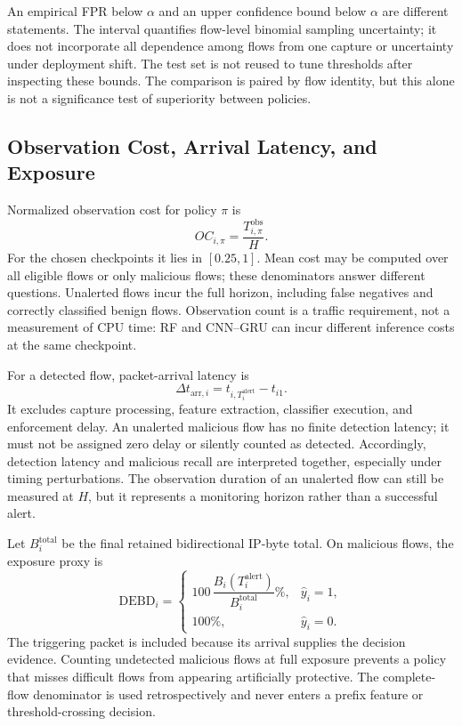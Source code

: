 \documentclass[conference]{IEEEtran}
\begin{document}
An empirical FPR below $\alpha$ and an upper confidence bound below $\alpha$ are different statements. The interval quantifies flow-level binomial sampling uncertainty; it does not incorporate all dependence among flows from one capture or uncertainty under deployment shift. The test set is not reused to tune thresholds after inspecting these bounds. The comparison is paired by flow identity, but this alone is not a significance test of superiority between policies.

\subsection{Observation Cost, Arrival Latency, and Exposure}
Normalized observation cost for policy $\pi$ is
\begin{equation}
OC_{i,\pi}=\frac{T_{i,\pi}^{\mathrm{obs}}}{H}.
\label{eq:observation_cost}
\end{equation}
For the chosen checkpoints it lies in $[0.25,1]$. Mean cost may be computed over all eligible flows or only malicious flows; these denominators answer different questions. Unalerted flows incur the full horizon, including false negatives and correctly classified benign flows. Observation count is a traffic requirement, not a measurement of CPU time: RF and CNN--GRU can incur different inference costs at the same checkpoint.

For a detected flow, packet-arrival latency is
\begin{equation}
\Delta t_{\mathrm{arr},i}
=t_{i,T_i^{\mathrm{alert}}}-t_{i1}.
\label{eq:arrival_latency}
\end{equation}
It excludes capture processing, feature extraction, classifier execution, and enforcement delay. An unalerted malicious flow has no finite detection latency; it must not be assigned zero delay or silently counted as detected. Accordingly, detection latency and malicious recall are interpreted together, especially under timing perturbations. The observation duration of an unalerted flow can still be measured at $H$, but it represents a monitoring horizon rather than a successful alert.

Let $B_i^{\mathrm{total}}$ be the final retained bidirectional IP-byte total. On malicious flows, the exposure proxy is
\begin{equation}
\mathrm{DEBD}_i=
\begin{cases}
100\,\dfrac{B_i(T_i^{\mathrm{alert}})}{B_i^{\mathrm{total}}}\%,
    & \widehat{y}_i=1,\\[4pt]
100\%,&\widehat{y}_i=0.
\end{cases}
\label{eq:debd}
\end{equation}
The triggering packet is included because its arrival supplies the decision evidence. Counting undetected malicious flows at full exposure prevents a policy that misses difficult flows from appearing artificially protective. The complete-flow denominator is used retrospectively and never enters a prefix feature or threshold-crossing decision.
\end{document}
